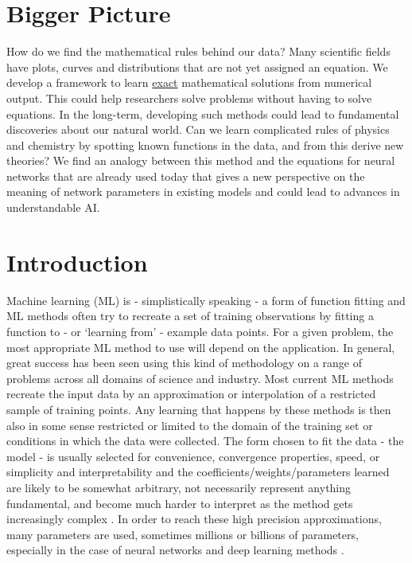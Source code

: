 \documentclass{article}
\begin{document}
\section{Bigger Picture}
How do we find the mathematical rules behind our data? Many scientific fields have plots, curves and distributions that are not yet assigned an equation. We develop a framework to learn \underline{exact} mathematical solutions from numerical output. This could help researchers solve problems without having to solve equations.
In the long-term, developing such methods could lead to fundamental discoveries about our natural world. Can we learn complicated rules of physics and chemistry by spotting known functions in the data, and from this derive new theories?
We find an analogy between this method and the equations for neural networks that are already used today that gives a new perspective on the meaning of network parameters in existing models and could lead to advances in understandable AI. 



\section{Introduction}
Machine learning (ML) is - simplistically speaking - a form of function fitting and ML methods often try to recreate a set of training observations by fitting a function to - or `learning from' - example data points. For a given problem, the most appropriate ML method to use will depend on the application. In general, great success has been seen using this kind of methodology on a range of problems across all domains of science and industry. Most current ML methods recreate the input data by an approximation or interpolation of a restricted sample of training points. Any learning that happens by these methods is then also in some sense restricted or limited to the domain of the training set or conditions in which the data were collected. The form chosen to fit the data - the model - is usually selected for convenience, convergence properties, speed, or simplicity and interpretability and the coefficients/weights/parameters learned are likely to be somewhat arbitrary, not necessarily represent anything fundamental, and become much harder to interpret as the method gets increasingly complex \cite{Carvalho2019}. In order to reach these high precision approximations, many parameters are used, sometimes millions or billions of parameters, especially in the case of neural networks and deep learning methods \cite{Lecun2015}.\\
\end{document}
